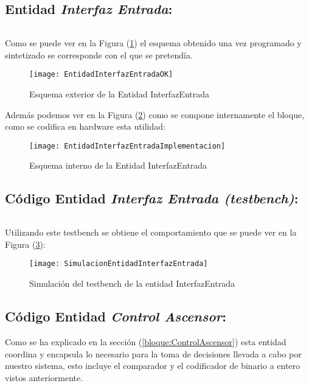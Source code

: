 \subsection{Entidad \textit{Interfaz Entrada}:} \label{code:InterfazEntrada}
	\inputminted[frame=lines,fontsize=\footnotesize,linenos]{vhdl}{CodeFiles/EntidadInterfazEntrada.vhd}

	Como se puede ver en la Figura (\ref{fig:EntidadInterfazEntradaOK}) el esquema obtenido una vez programado y sintetizado se corresponde con el que se pretendía.
    \begin{figure}[H]
		    \centering
		    \texttt{[image: EntidadInterfazEntradaOK]}
		    \caption{Esquema exterior de la Entidad InterfazEntrada}
		    \label{fig:EntidadInterfazEntradaOK}
	\end{figure}
    Además podemos ver en la Figura (\ref{fig:EntidadInterfazEntradaImplementacion}) como se compone internamente el bloque, como se codifica en hardware esta utilidad:
    \begin{figure}[H]
		    \centering
		    \texttt{[image: EntidadInterfazEntradaImplementacion]}
		    \caption{Esquema interno de la Entidad InterfazEntrada}
		    \label{fig:EntidadInterfazEntradaImplementacion}
	\end{figure}

\subsection{Código Entidad \textit{Interfaz Entrada (testbench)}:} \label{code:InterfazEntrada_tb}
	\inputminted[frame=lines,fontsize=\footnotesize,linenos]{vhdl}{CodeFiles/EntidadInterfazEntrada_tb.vhd}

    Utilizando este testbench se obtiene el comportamiento que se puede ver en la Figura (\ref{fig:SimulacionEntidadInterfazEntrada}):

    \begin{figure}[H]
		    \centering
		    \texttt{[image: SimulacionEntidadInterfazEntrada]}
		    \caption{Simulación del testbench de la entidad InterfazEntrada}
		    \label{fig:SimulacionEntidadInterfazEntrada}
	\end{figure}

\subsection{Código Entidad \textit{Control Ascensor}:} \label{code:ControlAscensor}
	Como se ha explicado en la sección (\ref{bloque:ControlAscensor}) esta entidad coordina y encapsula lo necesario para la toma de decisiones llevada a cabo por nuestro sistema, esto incluye el comparador y el codificador de binario a entero vistos anteriormente. \\ 

